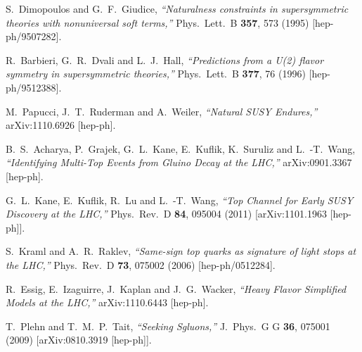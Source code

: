 \begin{thebibliography}{99}
  S.~Dimopoulos and G.~F.~Giudice,
  {\it ``Naturalness constraints in supersymmetric theories with nonuniversal soft terms,''}
  Phys.\ Lett.\ B {\bf 357}, 573 (1995)
  [hep-ph/9507282].


  R.~Barbieri, G.~R.~Dvali and L.~J.~Hall,
  {\it ``Predictions from a U(2) flavor symmetry in supersymmetric theories,''}
  Phys.\ Lett.\ B {\bf 377}, 76 (1996)
  [hep-ph/9512388].


  M.~Papucci, J.~T.~Ruderman and A.~Weiler,
  {\it ``Natural SUSY Endures,''}
  arXiv:1110.6926 [hep-ph].



  B.~S.~Acharya, P.~Grajek, G.~L.~Kane, E.~Kuflik, K.~Suruliz and L.~-T.~Wang,
  {\it ``Identifying Multi-Top Events from Gluino Decay at the LHC,''}
  arXiv:0901.3367 [hep-ph].

  G.~L.~Kane, E.~Kuflik, R.~Lu and L.~-T.~Wang,
  {\it ``Top Channel for Early SUSY Discovery at the LHC,''}
  Phys.\ Rev.\ D {\bf 84}, 095004 (2011)
  [arXiv:1101.1963 [hep-ph]].


  S.~Kraml and A.~R.~Raklev,
  {\it ``Same-sign top quarks as signature of light stops at the LHC,''}
  Phys.\ Rev.\ D {\bf 73}, 075002 (2006)
  [hep-ph/0512284].



  R.~Essig, E.~Izaguirre, J.~Kaplan and J.~G.~Wacker,
  {\it ``Heavy Flavor Simplified Models at the LHC,''}
  arXiv:1110.6443 [hep-ph].


  T.~Plehn and T.~M.~P.~Tait,
  {\it ``Seeking Sgluons,''}
  J.\ Phys.\ G G {\bf 36}, 075001 (2009)
  [arXiv:0810.3919 [hep-ph]].


\end{thebibliography}

